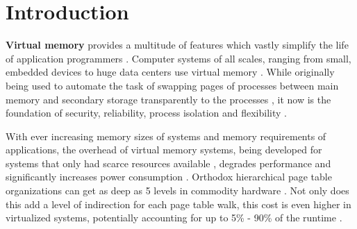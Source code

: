 \chapter{Introduction} %


















\textbf{Virtual memory} provides a multitude of features which vastly simplify the life of application programmers \cite{jacob1998virtualissues}. Computer systems of all scales, ranging from small, embedded devices to huge data centers use virtual memory \cite{bhattacharjee2017architectural}.
While originally being used to automate the task of swapping pages of processes between main memory and secondary storage transparently to the processes \cite{jacob1998virtualissues}, it now is the foundation of security, reliability, process isolation and flexibility \cite{wales1999virtual,jacobVirtualMemoryContemporary1998}.

With ever increasing memory sizes of systems and memory requirements of applications, the overhead of virtual memory systems, being developed for systems that only had scarce resources available \cite{halbuer2023morsels}, degrades performance and significantly increases power consumption \cite{zagieboylo2020cost}.
Orthodox hierarchical page table organizations \cite{tanenbaumOS} can get as deep as 5 levels in commodity hardware \cite{intel5LevelPaging5Level2017}. Not only does this add a level of indirection for each page table walk, this cost is even higher in virtualized systems, potentially accounting for up to 5\% - 90\% of the runtime \cite{yaniv2016hash}.

